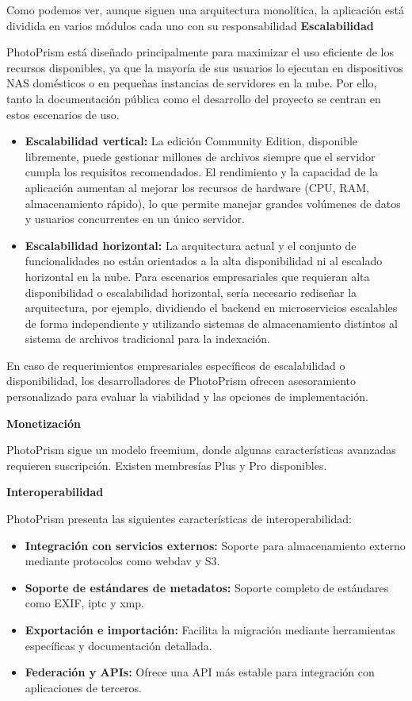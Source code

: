 Como podemos ver, aunque siguen una arquitectura monolítica, la aplicación está dividida en varios módulos cada uno con su responsabilidad
\textbf{Escalabilidad}

PhotoPrism está diseñado principalmente para maximizar el uso eficiente de los recursos disponibles, ya que la mayoría de sus usuarios lo ejecutan en dispositivos NAS domésticos o en pequeñas instancias de servidores en la nube. Por ello, tanto la documentación pública como el desarrollo del proyecto se centran en estos escenarios de uso.

\begin{itemize}
    \item \textbf{Escalabilidad vertical:} La edición Community Edition, disponible libremente, puede gestionar millones de archivos siempre que el servidor cumpla los requisitos recomendados. El rendimiento y la capacidad de la aplicación aumentan al mejorar los recursos de hardware (CPU, RAM, almacenamiento rápido), lo que permite manejar grandes volúmenes de datos y usuarios concurrentes en un único servidor.
    \item \textbf{Escalabilidad horizontal:} La arquitectura actual y el conjunto de funcionalidades no están orientados a la alta disponibilidad ni al escalado horizontal en la nube. Para escenarios empresariales que requieran alta disponibilidad o escalabilidad horizontal, sería necesario rediseñar la arquitectura, por ejemplo, dividiendo el backend en microservicios escalables de forma independiente y utilizando sistemas de almacenamiento distintos al sistema de archivos tradicional para la indexación.
\end{itemize}

En caso de requerimientos empresariales específicos de escalabilidad o disponibilidad, los desarrolladores de PhotoPrism ofrecen asesoramiento personalizado para evaluar la viabilidad y las opciones de implementación.

\textbf{Monetización}

PhotoPrism sigue un modelo freemium, donde algunas características avanzadas requieren suscripción. Existen membresías Plus y Pro disponibles.

\textbf{Interoperabilidad}

PhotoPrism presenta las siguientes características de interoperabilidad:

\begin{itemize}
    \item \textbf{Integración con servicios externos:} Soporte para almacenamiento externo mediante protocolos como \gls{webdav} y S3.
    \item \textbf{Soporte de estándares de metadatos:} Soporte completo de estándares como EXIF, \acrshort{iptc} y \acrshort{xmp}.
    \item \textbf{Exportación e importación:} Facilita la migración mediante herramientas específicas y documentación detallada.
    \item \textbf{Federación y APIs:} Ofrece una API más estable para integración con aplicaciones de terceros.
\end{itemize}

